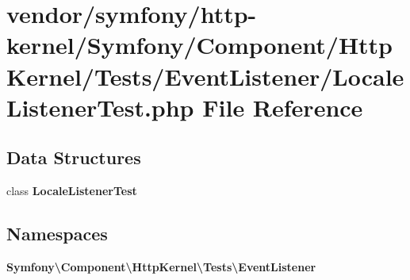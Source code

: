 \section{vendor/symfony/http-\/kernel/\+Symfony/\+Component/\+Http\+Kernel/\+Tests/\+Event\+Listener/\+Locale\+Listener\+Test.php File Reference}
\label{_locale_listener_test_8php}
\subsection*{Data Structures}
\begin{DoxyCompactItemize}
\item 
class {\bf Locale\+Listener\+Test}
\end{DoxyCompactItemize}
\subsection*{Namespaces}
\begin{DoxyCompactItemize}
\item 
 {\bf Symfony\textbackslash{}\+Component\textbackslash{}\+Http\+Kernel\textbackslash{}\+Tests\textbackslash{}\+Event\+Listener}
\end{DoxyCompactItemize}
